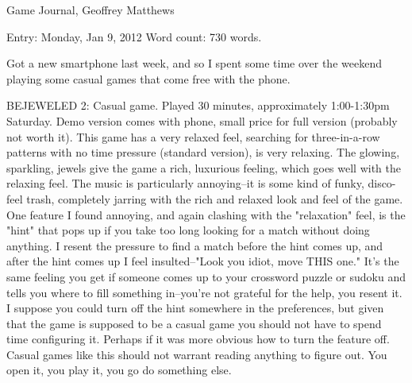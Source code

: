 \documentclass[]{article}
\begin{document}
\setlength{\parindent}{0in}

\bigskip
\tt

Game Journal,
Geoffrey Matthews

Entry:  Monday, Jan 9, 2012
Word count:  730 words.

Got a new smartphone last week, and so I spent some time over the
weekend playing some casual games that come free with the phone.

BEJEWELED 2: Casual game.  Played 30 minutes, approximately
1:00-1:30pm Saturday.  Demo version comes with phone, small price for
full version (probably not worth it).  This game has a very relaxed
feel, searching for three-in-a-row patterns with no time pressure
(standard version), is very relaxing.  The glowing, sparkling, jewels
give the game a rich, luxurious feeling, which goes well with the
relaxing feel.  The music is particularly annoying--it is some kind of
funky, disco-feel trash, completely jarring with the rich and relaxed
look and feel of the game.  One feature I found annoying, and again
clashing with the "relaxation" feel, is the "hint" that pops up if you
take too long looking for a match without doing anything.  I resent
the pressure to find a match before the hint comes up, and after the
hint comes up I feel insulted--"Look you idiot, move THIS one."  It's
the same feeling you get if someone comes up to your crossword puzzle
or sudoku and tells you where to fill something in--you're not
grateful for the help, you resent it.  I suppose you could turn off
the hint somewhere in the preferences, but given that the game is
supposed to be a casual game you should not have to spend time
configuring it.  Perhaps if it was more obvious how to turn the
feature off.  Casual games like this should not warrant reading
anything to figure out.  You open it, you play it, you go do something
else.
\end{document}
